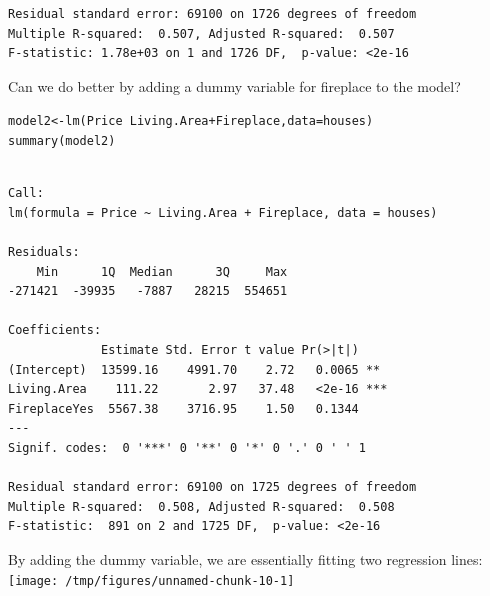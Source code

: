 \documentclass{beamer}\usepackage[]{graphicx}\usepackage[]{color}
\makeatletter
\newcommand{\hlopt}[1]{\textcolor[rgb]{1,0.894,0.769}{#1}}%
\newcommand{\hlstd}[1]{\textcolor[rgb]{1,0.894,0.769}{#1}}%
\newcommand{\hlkwb}[1]{\textcolor[rgb]{0.804,0.776,0.451}{#1}}%
\newcommand{\hlkwc}[1]{\textcolor[rgb]{0.78,0.941,0.545}{#1}}%
\newcommand{\hlkwd}[1]{\textcolor[rgb]{1,0.78,0.769}{#1}}%
\newenvironment{kframe}{%
 \def\at@end@of@kframe{}%
 \ifinner\ifhmode%
  \def\at@end@of@kframe{\end{minipage}}%
  \begin{minipage}{\columnwidth}%
 \fi\fi%
 \def\FrameCommand##1{\hskip\@totalleftmargin \hskip-\fboxsep
 \colorbox{shadecolor}{##1}\hskip-\fboxsep
     \hskip-\linewidth \hskip-\@totalleftmargin \hskip\columnwidth}%
 \MakeFramed {\advance\hsize-\width
   \@totalleftmargin\z@ \linewidth\hsize
   \@setminipage}}%
 {\par\unskip\endMakeFramed%
 \at@end@of@kframe}
\newenvironment{knitrout}{}{} %
\makeatother
\begin{document}
\begin{darkframes}
\begin{frame}[fragile]
\begin{knitrout}
\begin{kframe}
\begin{verbatim}
Residual standard error: 69100 on 1726 degrees of freedom
Multiple R-squared:  0.507,	Adjusted R-squared:  0.507 
F-statistic: 1.78e+03 on 1 and 1726 DF,  p-value: <2e-16
\end{verbatim}
\end{kframe}
\end{knitrout}
    \end{frame}

    \begin{frame}
      \begin{center}
        Can we do better by adding a dummy variable for fireplace to the model?
      \end{center}
    \end{frame}

    \begin{frame}[fragile]
      \fontsize{8}{8}\selectfont
\begin{knitrout}
\color{fgcolor}\begin{kframe}
\begin{alltt}
\hlstd{model2} \hlkwb{<-} \hlkwd{lm}\hlstd{(Price} \hlopt{~} \hlstd{Living.Area} \hlopt{+} \hlstd{Fireplace,} \hlkwc{data}\hlstd{=houses)}
\hlkwd{summary}\hlstd{(model2)}
\end{alltt}
\begin{verbatim}

Call:
lm(formula = Price ~ Living.Area + Fireplace, data = houses)

Residuals:
    Min      1Q  Median      3Q     Max 
-271421  -39935   -7887   28215  554651 

Coefficients:
             Estimate Std. Error t value Pr(>|t|)    
(Intercept)  13599.16    4991.70    2.72   0.0065 ** 
Living.Area    111.22       2.97   37.48   <2e-16 ***
FireplaceYes  5567.38    3716.95    1.50   0.1344    
---
Signif. codes:  0 '***' 0 '**' 0 '*' 0 '.' 0 ' ' 1

Residual standard error: 69100 on 1725 degrees of freedom
Multiple R-squared:  0.508,	Adjusted R-squared:  0.508 
F-statistic:  891 on 2 and 1725 DF,  p-value: <2e-16
\end{verbatim}
\end{kframe}
\end{knitrout}
    \end{frame}

    \begin{frame}
      By adding the dummy variable, we are essentially fitting two regression lines:
\begin{knitrout}
\color{fgcolor}
\texttt{[image: /tmp/figures/unnamed-chunk-10-1]} 


\end{knitrout}
\end{frame}
\end{darkframes}
\end{document}
